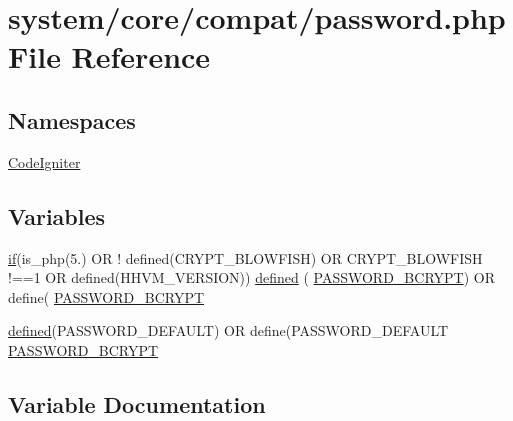 \hypertarget{password_8php}{}\section{system/core/compat/password.php File Reference}
\label{password_8php}
\subsection*{Namespaces}
\begin{DoxyCompactItemize}
\item 
 \mbox{\hyperlink{namespace_code_igniter}{Code\+Igniter}}
\end{DoxyCompactItemize}
\subsection*{Variables}
\begin{DoxyCompactItemize}
\item 
\mbox{\hyperlink{_code_igniter_8php_a68ca62d45495d195f67d234bdafb1d1f}{if}}(is\+\_\+php(\textquotesingle{}5.\textquotesingle{}) OR ! defined(\textquotesingle{}C\+R\+Y\+P\+T\+\_\+\+B\+L\+O\+W\+F\+I\+SH\textquotesingle{}) OR C\+R\+Y\+P\+T\+\_\+\+B\+L\+O\+W\+F\+I\+SH !==1 OR defined(\textquotesingle{}H\+H\+V\+M\+\_\+\+V\+E\+R\+S\+I\+ON\textquotesingle{})) \mbox{\hyperlink{password_8php_a74f41c0efe4435fb8ac2133464d3cd57}{defined}} ( \textquotesingle{}\mbox{\hyperlink{password_8php_a68891a3748e6362ed60dd2dc90d37576}{P\+A\+S\+S\+W\+O\+R\+D\+\_\+\+B\+C\+R\+Y\+PT}}\textquotesingle{}) OR define( \textquotesingle{}\mbox{\hyperlink{password_8php_a68891a3748e6362ed60dd2dc90d37576}{P\+A\+S\+S\+W\+O\+R\+D\+\_\+\+B\+C\+R\+Y\+PT}}\textquotesingle{}
\item 
\mbox{\hyperlink{password_8php_a74f41c0efe4435fb8ac2133464d3cd57}{defined}}(\textquotesingle{}P\+A\+S\+S\+W\+O\+R\+D\+\_\+\+D\+E\+F\+A\+U\+LT\textquotesingle{}) OR define(\textquotesingle{}P\+A\+S\+S\+W\+O\+R\+D\+\_\+\+D\+E\+F\+A\+U\+LT\textquotesingle{} \mbox{\hyperlink{password_8php_a68891a3748e6362ed60dd2dc90d37576}{P\+A\+S\+S\+W\+O\+R\+D\+\_\+\+B\+C\+R\+Y\+PT}}
\end{DoxyCompactItemize}


\subsection{Variable Documentation}
\mbox{\label{password_8php_a74f41c0efe4435fb8ac2133464d3cd57}} 
